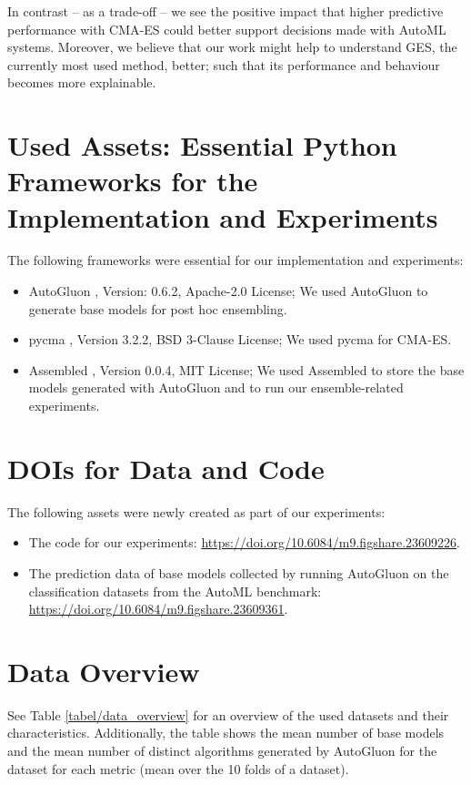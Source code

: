 \documentclass[11pt]{article}
\begin{document}
In contrast -- as a trade-off -- we see the positive impact that higher predictive performance with CMA-ES could  better support decisions made with AutoML systems.
Moreover, we believe that our work might help to understand GES, the currently most used method, better; such that its performance and behaviour becomes more explainable. 


\section{Used Assets: Essential Python Frameworks for the Implementation and Experiments}
\label{apdx/essential_assets}

The following frameworks were essential for our implementation and experiments:
\begin{itemize}
    \item AutoGluon \citep{ag1}, Version: 0.6.2, Apache-2.0 License; We used AutoGluon to generate base models for post hoc ensembling. 
    \item pycma \citep{hansen2019pycma}, Version 3.2.2, BSD 3-Clause License; We used pycma for CMA-ES. 
    \item Assembled \citep{purucker2022assembledopenml}, Version 0.0.4, MIT License; We used Assembled to store the base models generated with AutoGluon and to run our ensemble-related experiments. 
\end{itemize}

\section{DOIs for Data and Code}
\label{apdx/public_links}
The following assets were newly created as part of our experiments:
\begin{itemize}
    \item The code for our experiments: \url{https://doi.org/10.6084/m9.figshare.23609226}.
    \item The prediction data of base models collected by running AutoGluon on the classification datasets from the AutoML benchmark: \url{https://doi.org/10.6084/m9.figshare.23609361}.
\end{itemize}

\newpage
\section{Data Overview}
\label{apdx/data_overview}
See Table \ref{tabel/data_overview} for an overview of the used datasets and their characteristics.  
Additionally, the table shows the mean number of base models and the mean number of distinct algorithms generated by AutoGluon for the dataset for each metric (mean over the 10 folds of a dataset).
\end{document}
